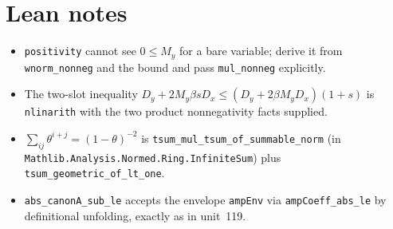 \documentclass[11pt]{article}
\begin{document}
\section{Lean notes}
\begin{itemize}
\item \texttt{positivity} cannot see $0\le M_y$ for a bare variable; derive it from
\texttt{wnorm\_nonneg} and the bound and pass \texttt{mul\_nonneg} explicitly.
\item The two-slot inequality $D_y+2M_y\beta sD_x\le(D_y+2\beta M_yD_x)(1+s)$ is
\texttt{nlinarith} with the two product nonnegativity facts supplied.
\item $\sum_{ij}\theta^{i+j}=(1-\theta)^{-2}$ is \texttt{tsum\_mul\_tsum\_of\_summable\_norm} (in
\texttt{Mathlib.Analysis.Normed.Ring.InfiniteSum}) plus \texttt{tsum\_geometric\_of\_lt\_one}.
\item \texttt{abs\_canonA\_sub\_le} accepts the envelope \texttt{ampEnv} via
\texttt{ampCoeff\_abs\_le} by definitional unfolding, exactly as in unit~119.
\end{itemize}
\end{document}
